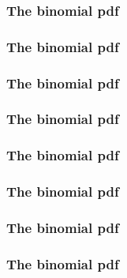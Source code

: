 \begin{frame}[fragile]\frametitle{The binomial pdf}


\end{frame}

\begin{frame}[fragile]\frametitle{The binomial pdf}


\end{frame}

\begin{frame}[fragile]\frametitle{The binomial pdf}


\end{frame}

\begin{frame}[fragile]\frametitle{The binomial pdf}


\end{frame}

\begin{frame}[fragile]\frametitle{The binomial pdf}


\end{frame}

\begin{frame}[fragile]\frametitle{The binomial pdf}


\end{frame}

\begin{frame}[fragile]\frametitle{The binomial pdf}


\end{frame}

\begin{frame}[fragile]\frametitle{The binomial pdf}


\end{frame}



